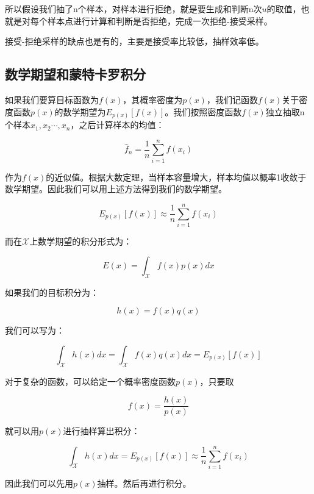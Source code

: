 所以假设我们抽了n个样本，对样本进行拒绝，就是要生成和判断n次\(u\)的取值，也就是对每个样本点进行计算和判断是否拒绝，完成一次拒绝-接受采样。

接受-拒绝采样的缺点也是有的，主要是接受率比较低，抽样效率低。
\subsection{数学期望和蒙特卡罗积分}
如果我们要算目标函数为\(f(x)\)，其概率密度为\(p(x)\)，我们记函数\(f(x)\)关于密度函数\(p(x)\)的数学期望为\(E_{p(x)}[f(x)]\)。我们按照密度函数\(f(x)\)独立抽取n个样本\(x_1,x_2\cdots,x_n\)，之后计算样本的均值：

\[\hat{f}_n=\frac{1}{n}\sum_{i=1}^{n}f(x_i)\]

作为\(f(x)\)的近似值。根据大数定理，当样本容量增大，样本均值以概率1收敛于数学期望。因此我们可以用上述方法得到我们的数学期望。

\[E_{p(x)}[f(x)]\approx\frac{1}{n}\sum_{i=1}^{n}f(x_i)\]

而在\(\mathcal{X}\)上数学期望的积分形式为：

\[E(x)=\int_{\mathcal{X}} f(x)p(x)dx\]

如果我们的目标积分为：

\[h(x)=f(x)q(x)\]

我们可以写为：

\[\int_{\mathcal{X}}h(x)dx=\int_{\mathcal{X}}f(x)q(x)dx=E_{p(x)}[f(x)]\]

对于复杂的函数，可以给定一个概率密度函数\(p(x)\)，只要取

\[f(x)=\frac{h(x)}{p(x)}\]

就可以用\(p(x)\)进行抽样算出积分：

\[\int_{\mathcal{X}}h(x)dx=E_{p(x)}[f(x)]\approx\frac{1}{n}\sum_{i=1}^{n}f(x_i)\]

因此我们可以先用\(p(x)\)抽样。然后再进行积分。
